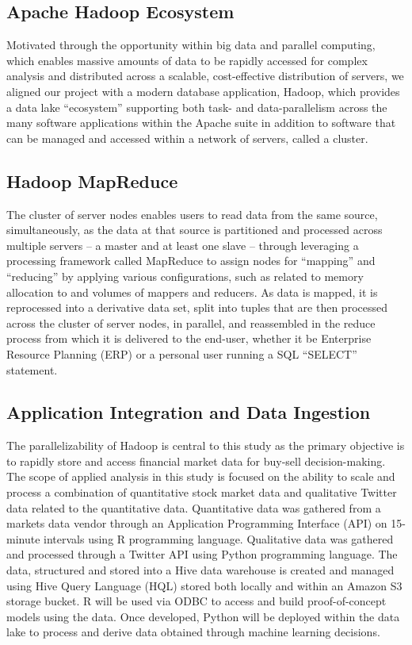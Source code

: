 \documentclass[journal]{IEEEtran}
\begin{document}
\subsection{Apache Hadoop Ecosystem}
Motivated through the opportunity within big data and parallel computing, which enables massive amounts of data to be rapidly accessed for complex analysis and distributed across a scalable, cost-effective distribution of servers, we aligned our project with a modern database application, Hadoop, which provides a data lake ``ecosystem'' supporting both task- and data-parallelism across the many software applications within the Apache suite in addition to software that can be managed and accessed within a network of servers, called a cluster.
\subsection{Hadoop MapReduce}
The cluster of server nodes enables users to read data from the same source, simultaneously, as the data at that source is partitioned and processed across multiple servers – a master and at least one slave – through leveraging a processing framework called MapReduce to assign nodes for ``mapping'' and ``reducing'' by applying various configurations, such as related to memory allocation to and volumes of mappers and reducers. As data is mapped, it is reprocessed into a derivative data set, split into tuples that are then processed across the cluster of server nodes, in parallel, and reassembled in the reduce process from which it is delivered to the end-user, whether it be Enterprise Resource Planning (ERP) or a personal user running a SQL “SELECT” statement.
\subsection{Application Integration and Data Ingestion}
The parallelizability of Hadoop is central to this study as the primary objective is to rapidly store and access financial market data for buy-sell decision-making. The scope of applied analysis in this study is focused on the ability to scale and process a combination of quantitative stock market data and qualitative Twitter data related to the quantitative data. 
Quantitative data was gathered from a markets data vendor through an Application Programming Interface (API) on 15-minute intervals using R programming language. Qualitative data was gathered and processed through a Twitter API using Python programming language. The data, structured and stored into a Hive data warehouse is created and managed using Hive Query Language (HQL) stored both locally and within an Amazon S3 storage bucket. R will be used via ODBC to access and build proof-of-concept models using the data. Once developed, Python will be deployed within the data lake to process and derive data obtained through machine learning decisions.
\end{document}
